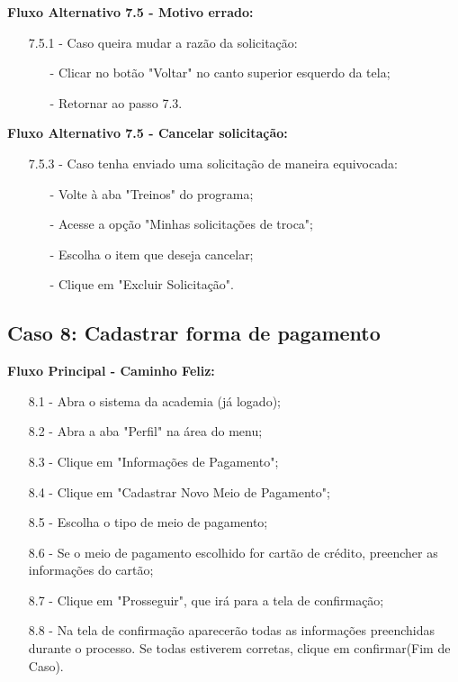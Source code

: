 \documentclass{article}
\begin{document}
    \textbf{Fluxo Alternativo 7.5 - Motivo errado:}

    \begin{itemize}
        \item[7.5.1 -] Caso queira mudar a razão da solicitação:
        \begin{itemize}
            \item[-] Clicar no botão "Voltar" no canto superior esquerdo da tela;
            \item[-] Retornar ao passo 7.3.
        \end{itemize}
    \end{itemize}

    \textbf{Fluxo Alternativo 7.5 - Cancelar solicitação:}

    \begin{itemize}
        \item[7.5.3 -] Caso tenha enviado uma solicitação de maneira equivocada:
        \begin{itemize}
            \item[-] Volte à aba "Treinos" do programa;
            \item[-] Acesse a opção "Minhas solicitações de troca";
            \item[-] Escolha o item que deseja cancelar;
            \item[-] Clique em "Excluir Solicitação".
        \end{itemize}
    \end{itemize}

\subsection{Caso 8: Cadastrar forma de pagamento}

    \textbf{Fluxo Principal - Caminho Feliz:}

    \begin{itemize}
        \item[8.1 -] Abra o sistema da academia (já logado);
        \item[8.2 -] Abra a aba "Perfil" na área do menu;
        \item[8.3 -] Clique em "Informações de Pagamento";
        \item[8.4 -] Clique em "Cadastrar Novo Meio de Pagamento";
        \item[8.5 -] Escolha o tipo de meio de pagamento;
        \item[8.6 -] Se o meio de pagamento escolhido for cartão de crédito, preencher as informações do cartão;
        \item[8.7 -] Clique em "Prosseguir", que irá para a tela de confirmação;
        \item[8.8 -] Na tela de confirmação aparecerão todas as informações preenchidas durante o processo. Se todas estiverem corretas, clique em confirmar(Fim de Caso).
    \end{itemize}
\end{document}
